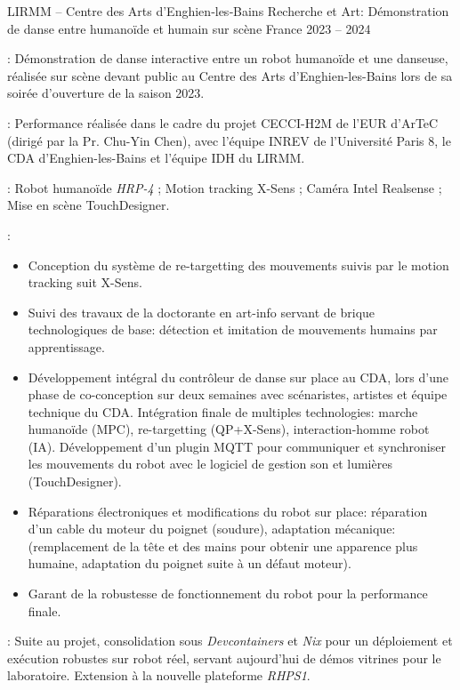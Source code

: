 \begin{cventries}
  \cventry
    {LIRMM -- Centre des Arts d’Enghien‑les‑Bains} %
    {Recherche et Art: Démonstration de danse entre humanoïde et humain sur scène} %
    {France} %
    {2023 -- 2024} %
    {
      \begin{cvitems} 
        \item {} : Démonstration de danse interactive entre un robot humanoïde et une danseuse, réalisée sur scène devant public au Centre des Arts d'Enghien-les-Bains lors de sa soirée d'ouverture de la saison 2023.
        \item {} : Performance réalisée dans le cadre du projet CECCI-H2M de l'EUR d'ArTeC (dirigé par la Pr. Chu-Yin Chen), avec l'équipe INREV de l'Université Paris 8, le CDA d'Enghien-les-Bains et l'équipe IDH du LIRMM.
        \item {} : Robot humanoïde \emph{HRP-4} ; Motion tracking X-Sens ; Caméra Intel Realsense ; Mise en scène TouchDesigner.
        \item {} :
          \begin{itemize}
            \item Conception du système de re-targetting des mouvements suivis par le motion tracking suit X-Sens.
            \item Suivi des travaux de la doctorante en art-info servant de brique technologiques de base: détection et imitation de mouvements humains par apprentissage.
            \item Développement intégral du contrôleur de danse sur place au CDA, lors d'une phase de co-conception sur deux semaines avec scénaristes, artistes et équipe technique du CDA. Intégration finale de multiples technologies: marche humanoïde (MPC), re-targetting (QP+X-Sens), interaction-homme robot (IA). Développement d'un plugin MQTT pour communiquer et synchroniser les mouvements du robot avec le logiciel de gestion son et lumières (TouchDesigner).
            \item Réparations électroniques et modifications du robot sur place: réparation d'un cable du moteur du poignet (soudure), adaptation mécanique: (remplacement de la tête et des mains pour obtenir une apparence plus humaine, adaptation du poignet suite à un défaut moteur).
            \item Garant de la robustesse de fonctionnement du robot pour la performance finale.
          \end{itemize}
          \item {}: Suite au projet, consolidation sous \emph{Devcontainers} et \emph{Nix} pour un déploiement et exécution robustes sur robot réel, servant aujourd'hui de démos vitrines pour le laboratoire. Extension à la nouvelle plateforme \emph{RHPS1}.
      \end{cvitems}
    }


\end{cventries}
